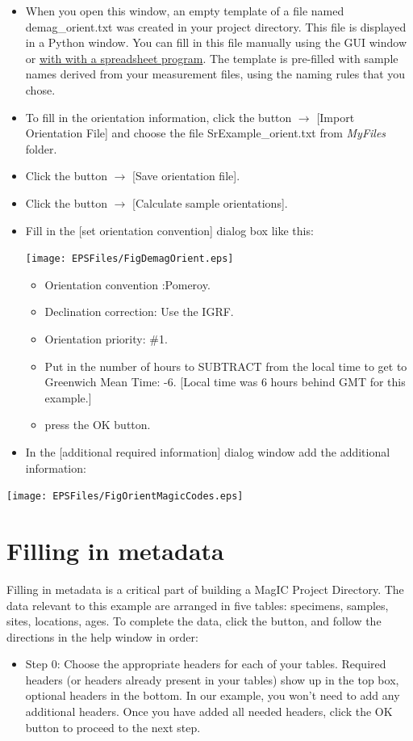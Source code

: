 \documentclass[11pt]{book}
\begin{document}
{{\begin{itemize}
\item When you open this window, an empty template of a file named demag\_orient.txt was created in your project directory. This file is displayed in a Python window. You can fill in  this file manually using the GUI window or \href{#field_info}{with with a spreadsheet program}. The template is pre-filled with sample names derived from your measurement files, using the naming rules that you chose.
\item To fill in the orientation information, click the button $\rightarrow$ [Import Orientation File] and  choose the file SrExample\_orient.txt from {\it MyFiles} folder.
\item Click the button $\rightarrow$ [Save orientation file].
\item Click the button $\rightarrow$ [Calculate sample orientations].
\item Fill in the [set orientation convention] dialog box like this:

\texttt{[image: EPSFiles/FigDemagOrient.eps]}

\begin{itemize}
\item Orientation convention :Pomeroy.
\item Declination correction: Use the IGRF.
\item  Orientation priority: \#1.
\item Put in the number of hours to SUBTRACT from the local time to get to Greenwich Mean Time: -6. [Local time was 6 hours behind GMT for this example.]
\item press the OK button.
\end{itemize}
\item In the [additional required information] dialog window add the additional information:
\end{itemize}

\texttt{[image: EPSFiles/FigOrientMagicCodes.eps]}

\section{Filling in metadata}

Filling in metadata is a critical part of building a MagIC Project Directory. The data relevant to this example are arranged in five tables: specimens, samples, sites, locations, ages. To complete the data, click the button, and follow the directions in the help window in order:

\begin{itemize}
\item Step 0: Choose the appropriate headers for each of your tables.  Required headers (or headers already present in your tables) show up in the top box, optional headers in the bottom.  In our example, you won't need to add any additional headers.  Once you have added all needed headers, click the OK button to proceed to the next step.


\end{itemize}}}
\end{document}
